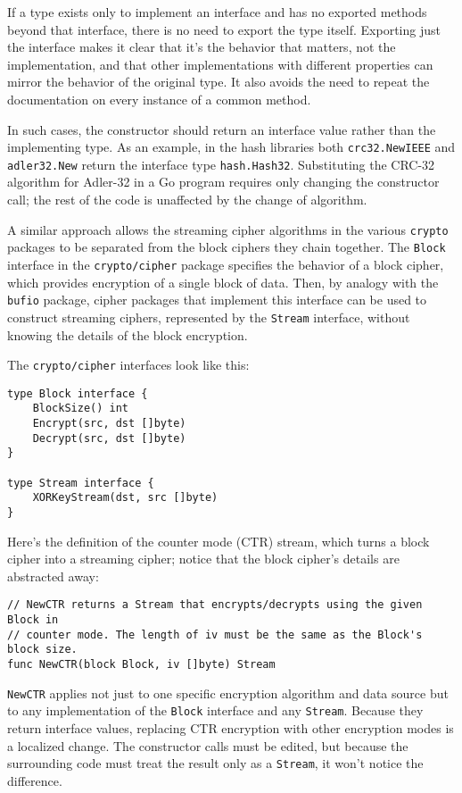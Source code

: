 If a type exists only to implement an interface and has no exported
methods beyond that interface, there is no need to export the type
itself. Exporting just the interface makes it clear that it's the
behavior that matters, not the implementation, and that other
implementations with different properties can mirror the behavior of the
original type. It also avoids the need to repeat the documentation on
every instance of a common method.

In such cases, the constructor should return an interface value rather
than the implementing type. As an example, in the hash libraries both
\texttt{crc32.NewIEEE} and \texttt{adler32.New} return the interface
type \texttt{hash.Hash32}. Substituting the CRC-32 algorithm for
Adler-32 in a Go program requires only changing the constructor call;
the rest of the code is unaffected by the change of algorithm.

A similar approach allows the streaming cipher algorithms in the various
\texttt{crypto} packages to be separated from the block ciphers they
chain together. The \texttt{Block} interface in the
\texttt{crypto/cipher} package specifies the behavior of a block cipher,
which provides encryption of a single block of data. Then, by analogy
with the \texttt{bufio} package, cipher packages that implement this
interface can be used to construct streaming ciphers, represented by the
\texttt{Stream} interface, without knowing the details of the block
encryption.

The \texttt{crypto/cipher} interfaces look like this:

\begin{Verbatim}[frame=single]
type Block interface {
    BlockSize() int
    Encrypt(src, dst []byte)
    Decrypt(src, dst []byte)
}

type Stream interface {
    XORKeyStream(dst, src []byte)
}
\end{Verbatim}

Here's the definition of the counter mode (CTR) stream, which turns a
block cipher into a streaming cipher; notice that the block cipher's
details are abstracted away:

\begin{Verbatim}[frame=single]
// NewCTR returns a Stream that encrypts/decrypts using the given Block in
// counter mode. The length of iv must be the same as the Block's block size.
func NewCTR(block Block, iv []byte) Stream
\end{Verbatim}

\texttt{NewCTR} applies not just to one specific encryption algorithm
and data source but to any implementation of the \texttt{Block}
interface and any \texttt{Stream}. Because they return interface values,
replacing CTR encryption with other encryption modes is a localized
change. The constructor calls must be edited, but because the
surrounding code must treat the result only as a \texttt{Stream}, it
won't notice the difference.

